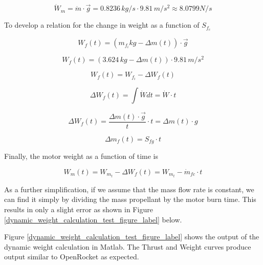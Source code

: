 \documentclass[]{article}
\begin{document}
\begin{equation}
\dot{W}_m = \dot{m} \cdot \vec{g} = 0.8236 \, kg/s \cdot 9.81 \, m/s^2 \approx 8.0799 N/s 
\end{equation}

To develop a relation for the change in weight as a function of
\(S_{f_c}\)

\begin{equation} 
W_f(t) = (m_{f_i} kg - \Delta m(t)) \cdot \vec{g} 
\end{equation}

\begin{equation}
W_f(t) = (3.624 \, kg - \Delta m(t)) \cdot 9.81 \, m/s^2 
\end{equation}

\begin{equation}
W_f(t) = W_{f_i} - \Delta W_f(t)
\end{equation}

\begin{equation}
\Delta W_f (t) = \int \dot{W} dt = \dot{W}\cdot t
\end{equation}

\begin{equation}
\Delta W_f (t) = \dfrac{\Delta m(t) \cdot \vec{g}}{t}\cdot t = \Delta m (t) \cdot g 
\end{equation}

\begin{equation}
\Delta m_f(t) = S_{fg} \cdot t
\end{equation}

Finally, the motor weight as a function of time is

\begin{equation}
W_m (t) = W_{m_t} - \Delta W_f(t) = W_{m_t} - \dot{m}_{fc} \cdot t
\end{equation}

As a further simplification, if we assume that the mass flow rate is
constant, we can find it simply by dividing the mass propellant by the
motor burn time. This results in only a slight error as shown in Figure
\ref{dynamic_weight_calculation_test_figure_label} below.

Figure \ref{dynamic_weight_calculation_test_figure_label} shows the
output of the dynamic weight calculation in Matlab. The Thrust and
Weight curves produce output similar to OpenRocket as expected.
\end{document}
